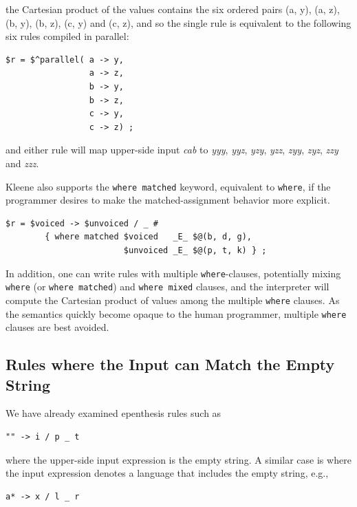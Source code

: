 \noindent
the Cartesian product of the values contains the six ordered pairs (a, y), (a, z), (b, y), (b, z), (c, y) and (c, z), and so
the single rule is equivalent to the following six rules compiled in parallel:

\begin{Verbatim}
$r = $^parallel( a -> y, 
                 a -> z, 
                 b -> y, 
                 b -> z, 
                 c -> y, 
                 c -> z) ;
\end{Verbatim}

\noindent
and either rule will map upper-side input \emph{cab} to \emph{yyy}, \emph{yyz}, \emph{yzy}, \emph{yzz}, \emph{zyy}, \emph{zyz},
\emph{zzy} and \emph{zzz}.


Kleene also supports the \texttt{where matched} keyword, equivalent to \texttt{where}, if the
programmer desires to make the matched-assignment behavior more explicit.

\begin{Verbatim}
$r = $voiced -> $unvoiced / _ #
        { where matched $voiced   _E_ $@(b, d, g), 
                        $unvoiced _E_ $@(p, t, k) } ;
\end{Verbatim}

\noindent
In addition, one can write rules with multiple \texttt{where}-clauses, potentially mixing \texttt{where} (or
\texttt{where matched}) and \texttt{where mixed} clauses, and the interpreter will compute the Cartesian product of values
among the multiple \texttt{where} clauses.  As the semantics quickly become opaque to the human programmer, multiple
\texttt{where} clauses are best avoided.

\subsection{Rules where the Input can Match the Empty String}

We have already examined epenthesis rules such as

\begin{Verbatim}
"" -> i / p _ t
\end{Verbatim}

\noindent
where the upper-side input expression is the empty string.  A similar case is where the input expression denotes a
language that includes the empty string, e.g.,

\begin{Verbatim}
a* -> x / l _ r
\end{Verbatim}

